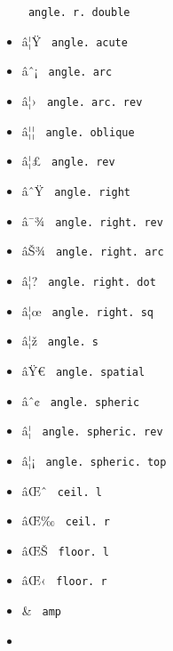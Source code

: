 \begin{itemize}
{  \texttt{\ angle.\ r.\ double\ }}
\item
  \label{symbol-angle.acute}{{ â¦Ÿ }
  \texttt{\ angle.\ acute\ }}
\item
  \label{symbol-angle.arc}{{ âˆ¡ }
  \texttt{\ angle.\ arc\ }}
\item
  \label{symbol-angle.arc.rev}{{ â¦› }
  \texttt{\ angle.\ arc.\ rev\ }}
\item
  \label{symbol-angle.oblique}{{ â¦¦ }
  \texttt{\ angle.\ oblique\ }}
\item
  \label{symbol-angle.rev}{{ â¦£ }
  \texttt{\ angle.\ rev\ }}
\item
  \label{symbol-angle.right}{{ âˆŸ }
  \texttt{\ angle.\ right\ }}
\item
  \label{symbol-angle.right.rev}{{ â¯¾ }
  \texttt{\ angle.\ right.\ rev\ }}
\item
  \label{symbol-angle.right.arc}{{ âŠ¾ }
  \texttt{\ angle.\ right.\ arc\ }}
\item
  \label{symbol-angle.right.dot}{{ â¦? }
  \texttt{\ angle.\ right.\ dot\ }}
\item
  \label{symbol-angle.right.sq}{{ â¦œ }
  \texttt{\ angle.\ right.\ sq\ }}
\item
  \label{symbol-angle.s}{{ â¦ž } \texttt{\ angle.\ s\ }}
\item
  \label{symbol-angle.spatial}{{ âŸ€ }
  \texttt{\ angle.\ spatial\ }}
\item
  \label{symbol-angle.spheric}{{ âˆ¢ }
  \texttt{\ angle.\ spheric\ }}
\item
  \label{symbol-angle.spheric.rev}{{ â¦ }
  \texttt{\ angle.\ spheric.\ rev\ }}
\item
  \label{symbol-angle.spheric.top}{{ â¦¡ }
  \texttt{\ angle.\ spheric.\ top\ }}
\item
  \label{symbol-ceil.l}{{ âŒˆ } \texttt{\ ceil.\ l\ }}
\item
  \label{symbol-ceil.r}{{ âŒ‰ } \texttt{\ ceil.\ r\ }}
\item
  \label{symbol-floor.l}{{ âŒŠ } \texttt{\ floor.\ l\ }}
\item
  \label{symbol-floor.r}{{ âŒ‹ } \texttt{\ floor.\ r\ }}
\item
  \label{symbol-amp}{{ \& } \texttt{\ amp\ }}
\item

\end{itemize}
